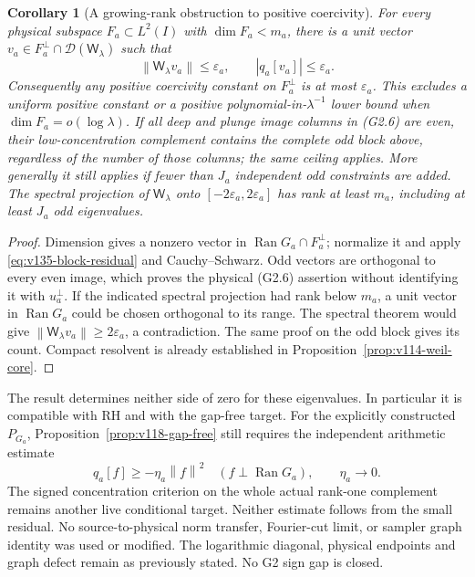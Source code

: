 \documentclass[11pt]{article}
\newtheorem{corollary}[theorem]{Corollary}
\theoremstyle{remark}
\newcommand{\norm}[1]{\left\lVert #1\right\rVert}
\begin{document}
\begin{corollary}[A growing-rank obstruction to positive coercivity]
\label{cor:v135-coercivity-obstruction}
For every physical subspace $F_a\subset L^2(I)$ with
$\dim F_a<m_a$, there is a unit vector
$v_a\in F_a^\perp\cap\mathcal D(\mathsf W_\lambda)$ such that
\begin{equation}\label{eq:v135-complement-ceiling}
 \norm{\mathsf W_\lambda v_a}\le\varepsilon_a,
 \qquad |q_a[v_a]|\le\varepsilon_a.
\end{equation}
Consequently any positive coercivity constant on $F_a^\perp$ is
at most $\varepsilon_a$.  This excludes a uniform positive constant
or a positive polynomial-in-$\lambda^{-1}$ lower bound when
$\dim F_a=o(\log\lambda)$.
If all deep and plunge image columns in (G2.6) are even, their
low-concentration complement contains the complete odd block above,
regardless of the number of those columns; the same ceiling applies.
More generally it still applies if fewer than $J_a$ independent odd
constraints are added.
The spectral projection of $\mathsf W_\lambda$ onto
$[-2\varepsilon_a,2\varepsilon_a]$ has rank at least $m_a$,
including at least $J_a$ odd eigenvalues.
\end{corollary}
\begin{proof}
Dimension gives a nonzero vector in
$\operatorname{Ran}G_a\cap F_a^\perp$; normalize it and apply
\eqref{eq:v135-block-residual} and Cauchy--Schwarz.
Odd vectors are orthogonal to every even image, which proves the
physical (G2.6) assertion without identifying it with $u_a^\perp$.
If the indicated spectral projection had rank below $m_a$, a unit
vector in $\operatorname{Ran}G_a$ could be chosen orthogonal to its
range.  The spectral theorem would give
$\norm{\mathsf W_\lambda v_a}\ge2\varepsilon_a$, a contradiction.
The same proof on the odd block gives its count. Compact resolvent
is already established in Proposition~\ref{prop:v114-weil-core}.
\end{proof}

The result determines neither side of zero for these eigenvalues.
In particular it is compatible with RH and with the gap-free target.
For the explicitly constructed $P_{G_a}$,
Proposition~\ref{prop:v118-gap-free} still requires the independent
arithmetic estimate
\[
 q_a[f]\ge-\eta_a\norm f^2\quad
 (f\perp\operatorname{Ran}G_a),\qquad \eta_a\longrightarrow0.
\]
The signed concentration criterion on the whole actual rank-one
complement remains another live conditional target.  Neither estimate
follows from the small residual.  No source-to-physical norm transfer,
Fourier-cut limit, or sampler graph identity was used or modified.
The logarithmic diagonal, physical endpoints and graph defect remain
as previously stated.  No G2 sign gap is closed.
\end{document}
